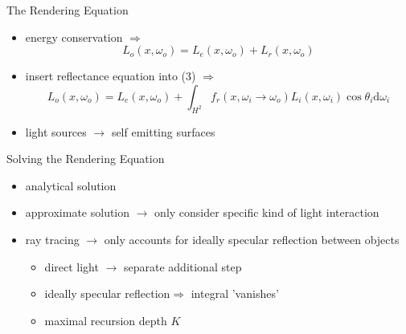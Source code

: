 \begin{frame}{The Rendering Equation}
\begin{itemize}
\pause
\item energy conservation $\Rightarrow$
\begin{equation}
L_o(x, \omega_o) =  L_e(x, \omega_o) +  L_r(x, \omega_o)
\end{equation}
\pause
\item insert reflectance equation into (3) $\Rightarrow$
\begin{equation} L_o(x, \omega_o) =  L_e(x, \omega_o) + \int_{H^2} f_r(x, \omega_i \rightarrow \omega_o) L_i(x, \omega_i) \cos \theta_i \mathrm{d}\omega_i 
\end{equation}
\pause
\item light sources  $\rightarrow$ self emitting surfaces
\end{itemize}
\end{frame}

\begin{frame}{Solving the Rendering Equation}
\begin{itemize}
\item analytical solution 
\pause
\item approximate solution $\rightarrow$ only consider specific kind of light interaction
\pause
\item ray tracing $\rightarrow$ only accounts for ideally specular reflection between objects
\begin{itemize}
	\pause
	\item direct light $\rightarrow$ separate additional step
    \pause
    \item  ideally specular reflection$\Rightarrow$ integral 'vanishes'
    \pause
    \item maximal recursion depth $K$
    \pause
\end{itemize}
\end{itemize}
\end{frame}

